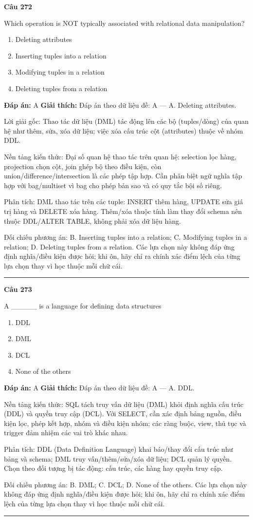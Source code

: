 \documentclass[11pt,a4paper]{article}
\newenvironment{question}[1]{%
  \par\vspace{1em}\noindent\textbf{\large Câu #1}\par\vspace{0.4em}
}{%
  \par\vspace{1em}\hrule\vspace{0.6em}
}
\newenvironment{choices}{%
  \begin{enumerate}[label=\textbf{\Alph*.},leftmargin=2.2em,itemsep=2pt,topsep=3pt]
}{%
  \end{enumerate}
}
\newcommand{\choice}{\item}
\begin{document}
\begin{question}{272}
Which operation is NOT typically associated with relational data manipulation?
\begin{choices}
\choice Deleting attributes
\choice Inserting tuples into a relation
\choice Modifying tuples in a relation
\choice Deleting tuples from a relation
\end{choices}
\textbf{Đáp án:} A
\textbf{Giải thích:} Đáp án theo dữ liệu đề: A — A. Deleting attributes.

Lời giải gốc: Thao tác dữ liệu (DML) tác động lên các bộ (tuples/dòng) của quan hệ như thêm, sửa, xóa dữ liệu; việc xóa cấu trúc cột (attributes) thuộc về nhóm DDL.

Nền tảng kiến thức: Đại số quan hệ thao tác trên quan hệ: selection lọc hàng, projection chọn cột, join ghép bộ theo điều kiện, còn union/difference/intersection là các phép tập hợp. Cần phân biệt ngữ nghĩa tập hợp với bag/multiset vì bag cho phép bản sao và có quy tắc bội số riêng.

Phân tích: DML thao tác trên các tuple: INSERT thêm hàng, UPDATE sửa giá trị hàng và DELETE xóa hàng. Thêm/xóa thuộc tính làm thay đổi schema nên thuộc DDL/ALTER TABLE, không phải xóa dữ liệu hàng.

Đối chiếu phương án: B. Inserting tuples into a relation; C. Modifying tuples in a relation; D. Deleting tuples from a relation. Các lựa chọn này không đáp ứng định nghĩa/điều kiện được hỏi; khi ôn, hãy chỉ ra chính xác điểm lệch của từng lựa chọn thay vì học thuộc mỗi chữ cái.
\end{question}

\begin{question}{273}
A _____ is a language for defining data structures
\begin{choices}
\choice DDL
\choice DML
\choice DCL
\choice None of the others
\end{choices}
\textbf{Đáp án:} A
\textbf{Giải thích:} Đáp án theo dữ liệu đề: A — A. DDL.

Nền tảng kiến thức: SQL tách truy vấn dữ liệu (DML) khỏi định nghĩa cấu trúc (DDL) và quyền truy cập (DCL). Với SELECT, cần xác định bảng nguồn, điều kiện lọc, phép kết hợp, nhóm và điều kiện nhóm; các ràng buộc, view, thủ tục và trigger đảm nhiệm các vai trò khác nhau.

Phân tích: DDL (Data Definition Language) khai báo/thay đổi cấu trúc như bảng và schema; DML truy vấn/thêm/sửa/xóa dữ liệu; DCL quản lý quyền. Chọn theo đối tượng bị tác động: cấu trúc, các hàng hay quyền truy cập.

Đối chiếu phương án: B. DML; C. DCL; D. None of the others. Các lựa chọn này không đáp ứng định nghĩa/điều kiện được hỏi; khi ôn, hãy chỉ ra chính xác điểm lệch của từng lựa chọn thay vì học thuộc mỗi chữ cái.
\end{question}
\end{document}
